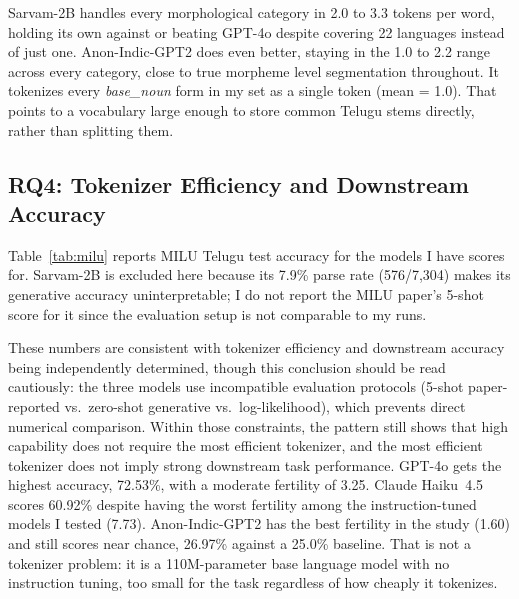 ﻿\documentclass[11pt]{article}
\begin{document}
Sarvam-2B handles every morphological category in 2.0 to 3.3 tokens
per word, holding its own against or beating GPT-4o despite covering
22 languages instead of just one. Anon-Indic-GPT2 does even
better, staying in the 1.0 to 2.2 range across every category, close
to true morpheme level segmentation throughout. It tokenizes every
\textit{base\_noun} form in my set as a single token (mean = 1.0).
That points to a vocabulary large enough to store common Telugu
stems directly, rather than splitting them.

\subsection{RQ4: Tokenizer Efficiency and Downstream Accuracy}
\label{sec:results-milu}

Table~\ref{tab:milu} reports MILU Telugu test accuracy for the
models I have scores for. Sarvam-2B is excluded here because its
7.9\% parse rate (576/7,304) makes its generative accuracy
uninterpretable; I do not report the MILU paper's 5-shot score for
it since the evaluation setup is not comparable to my runs.
\begin{table}[H]
\centering
{}
\caption{MILU Telugu accuracy and native informal fertility.
         Sarvam-2B excluded: 7.9\% parse rate (576/7{,}304) makes
         generative accuracy uninterpretable; its paper-reported
         5-shot score of 28.57\% uses an incomparable setup.
         Evaluation protocols differ across models (see \S\ref{sec:benchmark}).}
\label{tab:milu}
\end{table}
These numbers are consistent with tokenizer efficiency and
downstream accuracy being independently determined, though this
conclusion should be read cautiously: the three models use
incompatible evaluation protocols (5-shot paper-reported vs.\ zero-shot
generative vs.\ log-likelihood), which prevents direct numerical
comparison. Within those constraints, the pattern still shows that
high capability does not require the most efficient tokenizer, and
the most efficient tokenizer does not imply strong downstream task
performance. GPT-4o gets the highest accuracy, 72.53\%, with a
moderate fertility of 3.25. Claude Haiku~4.5 scores 60.92\% despite
having the worst fertility among the instruction-tuned models I
tested (7.73). Anon-Indic-GPT2 has the best fertility in the study
(1.60) and still scores near chance, 26.97\% against a 25.0\%
baseline. That is not a tokenizer problem: it is a 110M-parameter
base language model with no instruction tuning, too small for the
task regardless of how cheaply it tokenizes.
\end{document}
